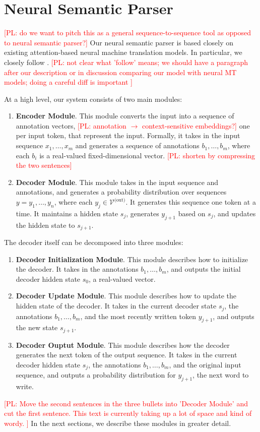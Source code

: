 \documentclass[11pt,letterpaper]{article}
\newcommand{\vocabout}{\mathcal{V}^{\text{(out)}}}
\newcommand\pl[1]{\textcolor{red}{[PL: #1]}}
\begin{document}
\section{Neural Semantic Parser}
\pl{do we want to pitch this as a general sequence-to-sequence tool as opposed to neural semantic parser?}
Our neural semantic parser is based closely on existing
attention-based neural machine translation models.
In particular, we closely follow .
\pl{not clear what 'follow' means; we should have a paragraph after our description
  or in discussion comparing our model with neural MT models;
  doing a careful diff is important
}

At a high level, our system consists of two main modules:
\begin{enumerate}
  \item \textbf{Encoder Module}.  This module 
    converts the input into a sequence of annotation vectors,
    \pl{annotation $\to$ context-sensitive embeddings?}
    one per input token, that represent the input.
    Formally, it takes in the input sequence
    $x_1, \dotsc, x_m$ and generates a sequence of 
    annotations $b_1, \dotsc, b_m$,
    where each $b_i$ is a real-valued fixed-dimensional vector.
    \pl{shorten by compressing the two sentences}
  \item \textbf{Decoder Module}.  This module
    takes in the input sequence and annotations,
    and generates a probability distribution
    over sequences $y = y_1, \dotsc, y_n$,
    where each $y_j \in \vocabout$.
    It generates this sequence one token at a time.
    It maintains a hidden state $s_j$,
    generates $y_{j+1}$ based on $s_j$,
    and updates the hidden state to $s_{j+1}$.
\end{enumerate}
The decoder itself can be decomposed into three modules:
\begin{enumerate}
  \item \textbf{Decoder Initialization Module}.
    This module describes how to initialize the decoder.
    It takes in the annotations $b_1, \dotsc, b_m$, and
    outputs the initial decoder hidden state $s_0$,
    a real-valued vector.
  \item \textbf{Decoder Update Module}.  This module describes
    how to update the hidden state of the decoder.
    It takes in the current decoder state $s_{j}$,
    the annotations $b_1, \dotsc, b_m$, and the most recently
    written token $y_{j+1}$, and outputs the new state $s_{j+1}$.
  \item \textbf{Decoder Ouptut Module}.  This module
    describes how the decoder generates the next token of the 
    output sequence.
    It takes in the current decoder hidden state $s_{j}$,
    the annotations $b_1, \dotsc, b_m$,
    and the original input sequence,
    and outputs a probability distribution 
    for $y_{j+1}$, the next word to write.
\end{enumerate}
\pl{Move the second sentences in the three bullets into 'Decoder Module'
  and cut the first sentence.
  This text is currently taking up a lot of space and kind of wordy.
}
In the next sections, we describe these modules in greater detail.
\end{document}
